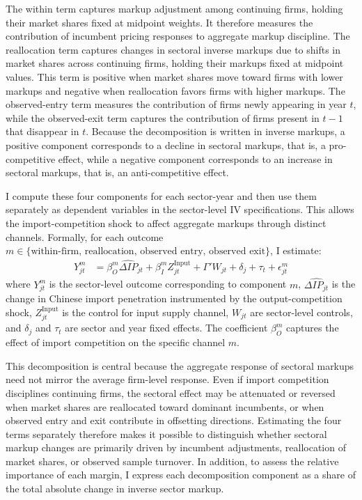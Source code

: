 \documentclass[12pt]{article}
\begin{document}
The within term captures markup adjustment among continuing firms, holding their market shares fixed at midpoint weights. It therefore measures the contribution of incumbent pricing responses to aggregate markup discipline. The reallocation term captures changes in sectoral inverse markups due to shifts in market shares across continuing firms, holding their markups fixed at midpoint values. This term is positive when market shares move toward firms with lower markups and negative when reallocation favors firms with higher markups. The observed-entry term measures the contribution of firms newly appearing in year $t$, while the observed-exit term captures the contribution of firms present in $t-1$ that disappear in $t$. Because the decomposition is written in inverse markups, a positive component corresponds to a decline in sectoral markups, that is, a pro-competitive effect, while a negative component corresponds to an increase in sectoral markups, that is, an anti-competitive effect.

I compute these four components for each sector-year and then use them separately as dependent variables in the sector-level IV specifications. This allows the import-competition shock to affect aggregate markups through distinct channels. Formally, for each outcome $m \in \{ \text{within-firm, reallocation, observed entry, observed exit} \}$, I estimate: 
\begin{equation}
\begin{aligned}
    Y^m_{jt} &= \beta_O^m \widehat{\Delta IP}_{jt} + \beta_I^m Z_{jt}^{\text{Input}} + \Gamma' W_{jt} + \delta_j + \tau_t + \epsilon_{jt}^m
\end{aligned}
\end{equation}
where $Y^m_{jt}$ is the sector-level outcome corresponding to component $m$, $\widehat{\Delta IP_{jt}}$ is the change in Chinese import penetration instrumented by the output-competition shock, $Z_{jt}^{\text{Input}}$ is the control for input supply channel, $W_{jt}$ are sector-level controls, and $\delta_j$ and $\tau_t$ are sector and year fixed effects. The coefficient $\beta_O^m$ captures the effect of import competition on the specific channel $m$.

This decomposition is central because the aggregate response of sectoral markups need not mirror the average firm-level response. Even if import competition disciplines continuing firms, the sectoral effect may be attenuated or reversed when market shares are reallocated toward dominant incumbents, or when observed entry and exit contribute in offsetting directions. Estimating the four terms separately therefore makes it possible to distinguish whether sectoral markup changes are primarily driven by incumbent adjustments, reallocation of market shares, or observed sample turnover. In addition, to assess the relative importance of each margin, I express each decomposition component as a share of the total absolute change in inverse sector markup. 
\end{document}
